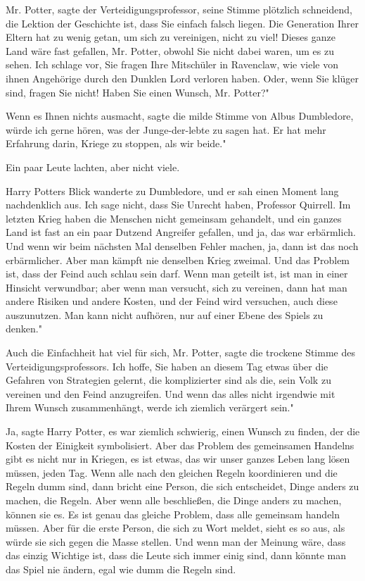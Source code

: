 \glqq Mr. Potter\grqq{}, sagte der Verteidigungsprofessor, seine Stimme
plötzlich schneidend, \glqq die Lektion der Geschichte ist, dass Sie einfach
falsch liegen. Die Generation Ihrer Eltern hat zu wenig getan, um sich zu
vereinigen, nicht zu viel! Dieses ganze Land wäre fast gefallen, Mr. Potter,
obwohl Sie nicht dabei waren, um es zu sehen. Ich schlage vor, Sie fragen Ihre
Mitschüler in Ravenclaw, wie viele von ihnen Angehörige durch den Dunklen Lord
verloren haben. Oder, wenn Sie klüger sind, fragen Sie nicht! Haben Sie einen
Wunsch, Mr. Potter?"

\glqq Wenn es Ihnen nichts ausmacht\grqq{}, sagte die milde Stimme von Albus
Dumbledore, \glqq würde ich gerne hören, was der Junge-der-lebte zu sagen hat.
Er hat mehr Erfahrung darin, Kriege zu stoppen, als wir beide."

Ein paar Leute lachten, aber nicht viele.

Harry Potters Blick wanderte zu Dumbledore, und er sah einen Moment lang
nachdenklich aus. \glqq Ich sage nicht, dass Sie Unrecht haben, Professor
Quirrell. Im letzten Krieg haben die Menschen nicht gemeinsam gehandelt, und ein
ganzes Land ist fast an ein paar Dutzend Angreifer gefallen, und ja, das war
erbärmlich. Und wenn wir beim nächsten Mal denselben Fehler machen, ja, dann ist
das noch erbärmlicher. Aber man kämpft nie denselben Krieg zweimal. Und das
Problem ist, dass der Feind auch schlau sein darf. Wenn man geteilt ist, ist man
in einer Hinsicht verwundbar; aber wenn man versucht, sich zu vereinen, dann hat
man andere Risiken und andere Kosten, und der Feind wird versuchen, auch diese
auszunutzen. Man kann nicht aufhören, nur auf einer Ebene des Spiels zu denken."

\glqq Auch die Einfachheit hat viel für sich, Mr. Potter\grqq{}, sagte die
trockene Stimme des Verteidigungsprofessors. \glqq Ich hoffe, Sie haben an
diesem Tag etwas über die Gefahren von Strategien gelernt, die komplizierter
sind als die, sein Volk zu vereinen und den Feind anzugreifen. Und wenn das
alles nicht irgendwie mit Ihrem Wunsch zusammenhängt, werde ich ziemlich
verärgert sein."

\glqq Ja\grqq{}, sagte Harry Potter, \glqq es war ziemlich schwierig, einen
Wunsch zu finden, der die Kosten der Einigkeit symbolisiert. Aber das Problem
des gemeinsamen Handelns gibt es nicht nur in Kriegen, es ist etwas, das wir
unser ganzes Leben lang lösen müssen, jeden Tag. Wenn alle nach den gleichen
Regeln koordinieren und die Regeln dumm sind, dann bricht eine Person, die sich
entscheidet, Dinge anders zu machen, die Regeln. Aber wenn alle beschließen, die
Dinge anders zu machen, können sie es. Es ist genau das gleiche Problem, dass
alle gemeinsam handeln müssen. Aber für die erste Person, die sich zu Wort
meldet, sieht es so aus, als würde sie sich gegen die Masse stellen. Und wenn
man der Meinung wäre, dass das einzig Wichtige ist, dass die Leute sich immer
einig sind, dann könnte man das Spiel nie ändern, egal wie dumm die Regeln sind.

